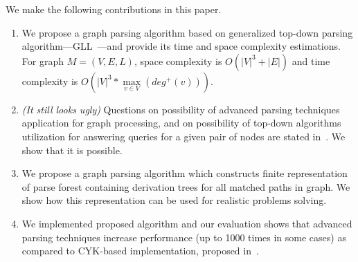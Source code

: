 \documentclass[runningheads,a4paper]{llncs}
\begin{document}
We make the following contributions in this paper.
\begin{enumerate}
\item We propose a graph parsing algorithm based on generalized top-down parsing algorithm---GLL~\cite{scott2010gll}---and provide its time and space complexity estimations. 
For graph $M=(V,E,L)$, space complexity is $O(|V|^3 + |E|)$ and time complexity is $O\left(|V|^3*\max\limits_{v \in V}\left(deg^+\left(v\right)\right)\right)$.
\item \emph{(It still looks ugly)} Questions on possibility of advanced parsing techniques application for graph processing, and on possibility of top-down algorithms utilization for  answering
queries for a given pair of nodes are stated in~\cite{Hellings16}. We show that it is possible.
\item We propose a graph parsing algorithm which constructs finite representation of parse forest containing derivation trees for all matched paths in graph. We show how this representation can be used for realistic problems solving.
\item We implemented proposed algorithm and our evaluation shows that advanced parsing techniques increase performance (up to 1000 times in some cases) as compared to CYK-based implementation, proposed in~\cite{CFGonRDF}.
\end{enumerate}











\end{document}
